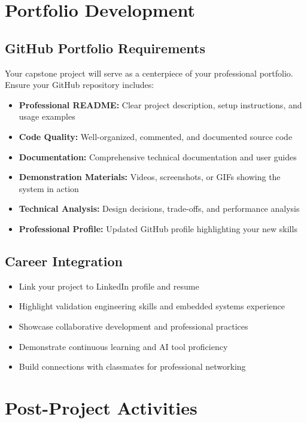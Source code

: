 \documentclass[11pt,a4paper]{article}
\begin{document}
\section{Portfolio Development}

\subsection{GitHub Portfolio Requirements}
Your capstone project will serve as a centerpiece of your professional portfolio. Ensure your GitHub repository includes:

\begin{itemize}
    \item \textbf{Professional README:} Clear project description, setup instructions, and usage examples
    \item \textbf{Code Quality:} Well-organized, commented, and documented source code
    \item \textbf{Documentation:} Comprehensive technical documentation and user guides
    \item \textbf{Demonstration Materials:} Videos, screenshots, or GIFs showing the system in action
    \item \textbf{Technical Analysis:} Design decisions, trade-offs, and performance analysis
    \item \textbf{Professional Profile:} Updated GitHub profile highlighting your new skills
\end{itemize}

\subsection{Career Integration}
\begin{itemize}
    \item Link your project to LinkedIn profile and resume
    \item Highlight validation engineering skills and embedded systems experience
    \item Showcase collaborative development and professional practices
    \item Demonstrate continuous learning and AI tool proficiency
    \item Build connections with classmates for professional networking
\end{itemize}

\section{Post-Project Activities}
\end{document}
